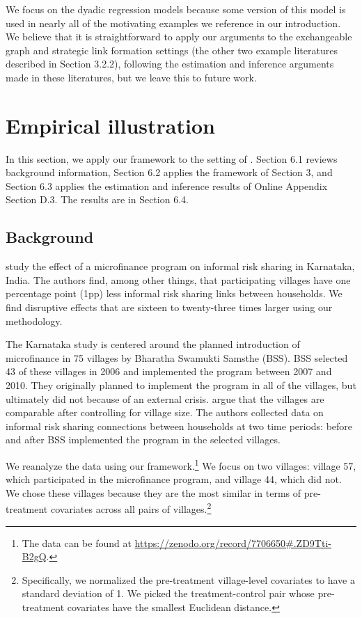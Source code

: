 \documentclass[12pt]{article}
\theoremstyle{definition}
\begin{document}
We focus on the dyadic regression models because some version of this model is used in nearly all of the motivating examples we reference in our introduction. We believe that it is straightforward to apply our arguments to the exchangeable graph and strategic link formation settings (the other two example literatures described in Section 3.2.2), following the estimation and inference arguments made in these literatures, but we leave this to future work.  



\section{Empirical illustration}
In this section, we apply our framework to the setting of  \cite{banerjee2021changes}. Section 6.1 reviews background information, Section 6.2 applies the framework of Section 3, and Section 6.3 applies the estimation and inference results of Online Appendix Section D.3. The results are in Section 6.4.  

\subsection{Background}
 \cite{banerjee2021changes} study the effect of a microfinance program on informal risk sharing in Karnataka, India. The authors find, among other things, that participating villages have one percentage point (1pp) less informal risk sharing links between households. We find disruptive effects that are sixteen to twenty-three times larger using our methodology.  

The Karnataka study is centered around the planned introduction of microfinance in 75 villages by Bharatha Swamukti Samsthe (BSS). BSS selected 43 of these villages in 2006 and implemented the program between 2007 and 2010. They originally planned to implement the program in all of the  villages, but ultimately did not because of an external crisis. \cite{banerjee2021changes} argue that the villages are comparable after controlling for village size. The authors collected data on informal risk sharing connections between households at two time periods: before and after BSS implemented the program in the selected villages.   

We reanalyze the \cite{banerjee2021changes} data using our framework.\footnote{The data can be found at \url{https://zenodo.org/record/7706650\#.ZD9Tti-B2gQ}.} We focus on two villages: village 57, which participated in the microfinance program, and village 44, which did not. We chose these villages because they are the most similar in terms of pre-treatment covariates across all pairs of villages.\footnote{Specifically, we normalized the pre-treatment village-level covariates to have a standard deviation of 1. We picked the treatment-control pair whose pre-treatment covariates have the smallest Euclidean distance.}   
\end{document}
